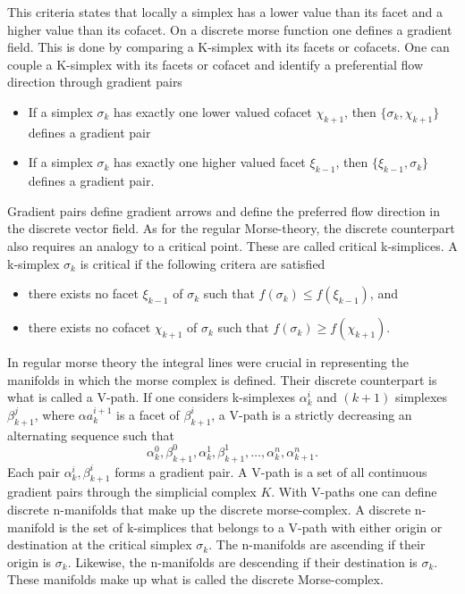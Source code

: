 This criteria states that locally a simplex has a lower value than its facet and
a higher value than its cofacet. On a discrete morse function one defines a
gradient field. This is done by comparing a K-simplex with its facets or
cofacets. One can couple a K-simplex with its facets or cofacet and identify a
preferential flow direction through gradient pairs
\begin{itemize}
    \item If a simplex $\sigma_k$ has exactly one lower valued cofacet $\chi_{k+1}$, then
          $\{\sigma_k,\chi_{k+1}\}$ defines a gradient pair
    \item If a simplex $\sigma_k$ has exactly one higher valued facet $\xi_{k-1}$, then
          $\{\xi_{k-1},\sigma_{k}\}$ defines a gradient pair.
\end{itemize}
Gradient pairs define gradient arrows and define the preferred flow direction in
the discrete vector field. As for the regular Morse-theory, the discrete
counterpart also requires an analogy to a critical point. These are called
critical k-simplices. A k-simplex $\sigma_k$ is critical if the following
critera are satisfied
\begin{itemize}
    \item there exists no facet $\xi_{k-1}$ of $\sigma_{k}$ such
    that $f(\sigma_k)\leq f(\xi_{k-1})$, and
    \item there exists no cofacet $\chi_{k+1}$ of $\sigma_{k}$ such
    that $f(\sigma_k)\geq f(\chi_{k+1})$.
\end{itemize}
In regular morse theory the integral lines were crucial in representing the
manifolds in which the morse complex is defined. Their discrete counterpart
is what is called a V-path. If one considers k-simplexes $\alpha^i_k$ and
$(k+1)$ simplexes $\beta^j_{k+1}$, where $\alpha a^{i+1}_k$ is a facet of $\beta^i_{k+1}$, a
V-path is a strictly decreasing an alternating sequence such that
\begin{equation}
    \alpha^0_k, \beta^0_{k+1},\alpha^1_k,\beta^1_{k+1},\dots,\alpha^n_k,\alpha^n_{k+1}.
\end{equation}
Each pair ${\alpha^i_k,\beta^i_{k+1}}$ forms a gradient pair. A V-path is a set
of all continuous gradient pairs through the simplicial complex $K$.
With V-paths one can define discrete n-manifolds that make up the discrete
morse-complex. A discrete n-manifold is the set of k-simplices that belongs to a
V-path with either origin or destination at the critical simplex $\sigma_k$.
The n-manifolds are ascending if their origin is $\sigma_k$. Likewise,
the n-manifolds are descending if their destination is $\sigma_k$. These
manifolds make up what is called the discrete Morse-complex.

